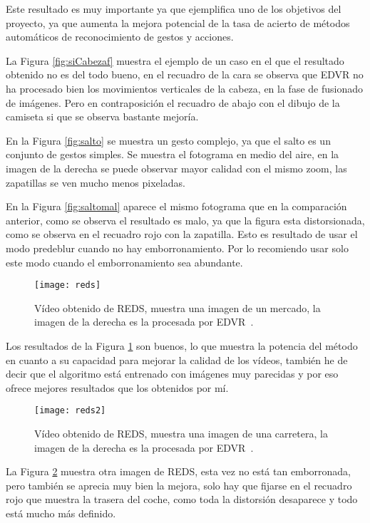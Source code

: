 Este resultado es muy importante ya que ejemplifica uno de los objetivos del proyecto, ya que aumenta la mejora potencial de la tasa de acierto de métodos automáticos de reconocimiento de gestos y acciones.


La Figura \ref{fig:siCabezaf} muestra el ejemplo de un caso en el que el resultado obtenido no es del todo bueno, en el recuadro de la cara se observa que EDVR no ha procesado bien los movimientos verticales de la cabeza, en la fase de fusionado de imágenes. Pero en contraposición el recuadro de abajo con el dibujo de la camiseta si que se observa bastante mejoría.

En la Figura \ref{fig:salto} se muestra un gesto complejo, ya que el salto es un conjunto de gestos simples. Se muestra el fotograma en medio del aire, en la imagen de la derecha se puede observar mayor calidad con el mismo zoom, las zapatillas se ven mucho menos pixeladas.


En la Figura \ref{fig:saltomal} aparece el mismo fotograma que en la comparación anterior, como se observa el resultado es malo, ya que la figura esta distorsionada, como se observa en el recuadro rojo con la zapatilla. Esto es resultado de usar el modo predeblur cuando no hay emborronamiento. Por lo recomiendo usar solo este modo cuando el  emborronamiento sea abundante.

\begin{figure}[!h]
		\centering
		\texttt{[image: reds]}
		\caption{Vídeo obtenido de REDS, muestra una imagen de un mercado, la imagen de la derecha es la procesada por EDVR~\cite{wang2019edvr}.}\label{5}
	\end{figure}
	\FloatBarrier


Los resultados de la Figura \ref{5} son buenos, lo que muestra la potencia del método en cuanto a su capacidad para mejorar la calidad de los vídeos, también he de decir que el algoritmo está entrenado con imágenes muy parecidas y por eso ofrece mejores resultados que los obtenidos por mí.

\begin{figure}[!h]
		\centering
		\texttt{[image: reds2]}
		\caption{Vídeo obtenido de REDS, muestra una imagen de una carretera, la imagen de la derecha es la procesada por EDVR~\cite{wang2019edvr}.}\label{10}
	\end{figure}
	\FloatBarrier

La Figura \ref{10} muestra otra imagen de REDS, esta vez no está tan emborronada, pero también se aprecia muy bien la mejora, solo hay que fijarse en el recuadro rojo que muestra la trasera del coche, como toda la distorsión desaparece y todo está mucho más definido.




